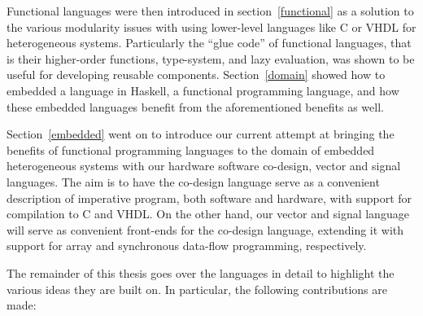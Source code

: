 \documentclass[../paper.tex]{subfiles}
\begin{document}
Functional languages were then introduced in section~\ref{functional} as a solution to the various modularity issues with using lower-level languages like C or VHDL for heterogeneous systems. Particularly the ``glue code'' of functional languages, that is their higher-order functions, type-system, and lazy evaluation, was shown to be useful for developing reusable components. Section~\ref{domain} showed how to embedded a language in Haskell, a functional programming language, and how these embedded languages benefit from the aforementioned benefits as well.

Section~\ref{embedded} went on to introduce our current attempt at bringing the benefits of functional programming languages to the domain of embedded heterogeneous systems with our hardware software co-design, vector and signal languages. The aim is to have the co-design language serve as a convenient description of imperative program, both software and hardware, with support for compilation to C and VHDL. On the other hand, our vector and signal language will serve as convenient front-ends for the co-design language, extending it with support for array and synchronous data-flow programming, respectively.

The remainder of this thesis goes over the languages in detail to highlight the various ideas they are built on. In particular, the following contributions are made:
\end{document}

